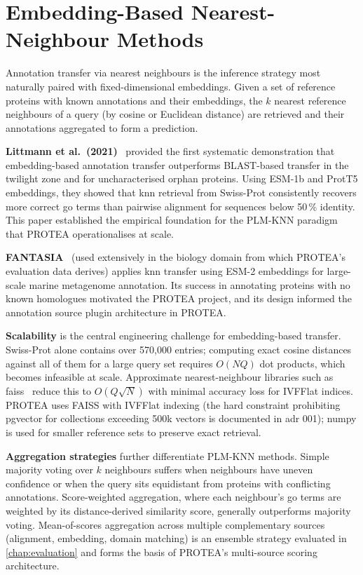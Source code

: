 \section{Embedding-Based Nearest-Neighbour Methods}
\label{sec:related-knn}

Annotation transfer via nearest neighbours is the inference strategy most
naturally paired with fixed-dimensional embeddings. Given a set of reference
proteins with known annotations and their embeddings, the $k$ nearest reference
neighbours of a query (by cosine or Euclidean distance) are retrieved and their
annotations aggregated to form a prediction.

\textbf{Littmann et al.\ (2021)}~\cite{littmann2021embeddings} provided the first
systematic demonstration that embedding-based annotation transfer outperforms
BLAST-based transfer in the twilight zone and for uncharacterised orphan proteins.
Using ESM-1b and ProtT5 embeddings, they showed that \gls{knn} retrieval from
Swiss-Prot consistently recovers more correct \gls{go} terms than pairwise alignment
for sequences below 50\,\% identity. This paper established the empirical
foundation for the PLM-KNN paradigm that PROTEA operationalises at scale.

\textbf{FANTASIA}~\cite{fantasia2024} (used extensively in the biology domain
from which PROTEA's evaluation data derives) applies \gls{knn} transfer using
ESM-2 embeddings for large-scale marine metagenome annotation. Its success in
annotating proteins with no known homologues motivated the PROTEA project, and
its design informed the annotation source plugin architecture in PROTEA.

\textbf{Scalability} is the central engineering challenge for embedding-based
transfer. Swiss-Prot alone contains over 570,000 entries; computing exact cosine
distances against all of them for a large query set requires $O(NQ)$ dot products,
which becomes infeasible at scale. Approximate nearest-neighbour libraries such
as \gls{faiss}~\cite{johnson2021faiss} reduce this to $O(Q\sqrt{N})$ with minimal
accuracy loss for IVFFlat indices. PROTEA uses FAISS with IVFFlat indexing
(the hard constraint prohibiting pgvector for collections exceeding 500k vectors
is documented in \gls{adr} 001); numpy is used for smaller reference sets to preserve
exact retrieval.

\textbf{Aggregation strategies} further differentiate PLM-KNN methods. Simple
majority voting over $k$ neighbours suffers when neighbours have uneven confidence
or when the query sits equidistant from proteins with conflicting annotations.
Score-weighted aggregation, where each neighbour's \gls{go} terms are weighted by
its distance-derived similarity score, generally outperforms majority voting.
Mean-of-scores aggregation across multiple complementary sources (alignment,
embedding, domain matching) is an ensemble strategy evaluated in
\cref{chap:evaluation} and forms the basis of PROTEA's multi-source scoring
architecture.

